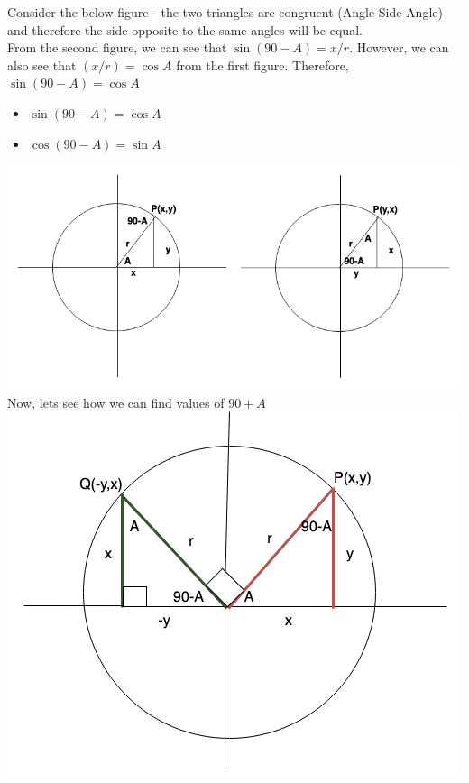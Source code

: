 \documentclass{book}
\begin{document}
	Consider the below figure - the two triangles are congruent (Angle-Side-Angle) and therefore the side opposite to the same angles will be equal.\\
	From the second figure, we can see that $\sin(90-A) = {x/r}$. However, we can also see that $(x/r)= \cos{A}$ from the first figure. Therefore, $\sin{(90-A)}= \cos{A}$
	\begin{mdframed}[backgroundcolor=yellow]
		\begin{itemize}
			\item$\sin(90-A) = \cos{A}$
			\item $\cos(90-A) = \sin{A}$
			
		\end{itemize}
	\end{mdframed}
	
	\includegraphics[scale=0.6]{compangle} \\
	
	Now, lets see how we can find values of $90+A$ \\
	
	\includegraphics[scale=0.6]{compangle1} \\
	
\end{document}
